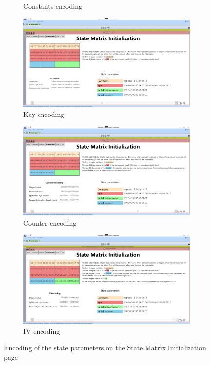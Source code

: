 \begin{figure}
\begin{subfigure}{0.5\textwidth}
  \caption{Constants encoding}
  \label{fig:statematrix.encoding.constants}
\end{subfigure}%
\begin{subfigure}{0.5\textwidth}
  \centering
  \includegraphics[width=0.99\textwidth]{figures/ct2/state-matrix/2-state-matrix-key.png}
  \caption{Key encoding}
  \label{fig:statematrix.encoding.key}
\end{subfigure}
\begin{subfigure}{0.5\textwidth}
  \centering
  \includegraphics[width=0.99\textwidth]{figures/ct2/state-matrix/3-state-matrix-counter.png}
  \caption{Counter encoding}
  \label{fig:statematrix.encoding.counter}
\end{subfigure}%
\begin{subfigure}{0.5\textwidth}
  \centering
  \includegraphics[width=0.99\textwidth]{figures/ct2/state-matrix/4-state-matrix-iv.png}
  \caption{IV encoding}
  \label{fig:statematrix.encoding.iv}
\end{subfigure}
\caption[State Matrix Initialization page]{Encoding of the state parameters on the State Matrix Initialization page}
\label{fig:statematrix.encoding}
\end{figure}

